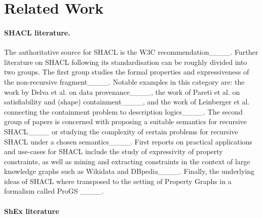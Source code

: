 \section{Related Work}
\paragraph{SHACL literature.} The authoritative source for SHACL is the W3C recommendation____.
Further literature on SHACL following its standardisation can be roughly divided into two groups. The first group studies the formal properties and expressiveness of the non-recursive fragment____. Notable examples in this category are: the work by Delva et al. on data provenance____, the work of Pareti et al. on satisfiability and (shape) containment____, and the work of Leinberger et al. connecting the containment problem to description logics____.
The second group of papers is concerned with proposing a suitable semantics for recursive SHACL____ or studying the complexity of certain problems for recursive SHACL under a chosen semantics____. First reports on practical applications and use-cases for SHACL include the study of expressivity of property constraints, as well as  mining and extracting constraints in the context of large knowledge graphs such as Wikidata and DBpedia____. Finally, the underlying ideas of SHACL where transposed to the setting of Property Graphs in a formalism called ProGS ____.

\paragraph{ShEx literature}


